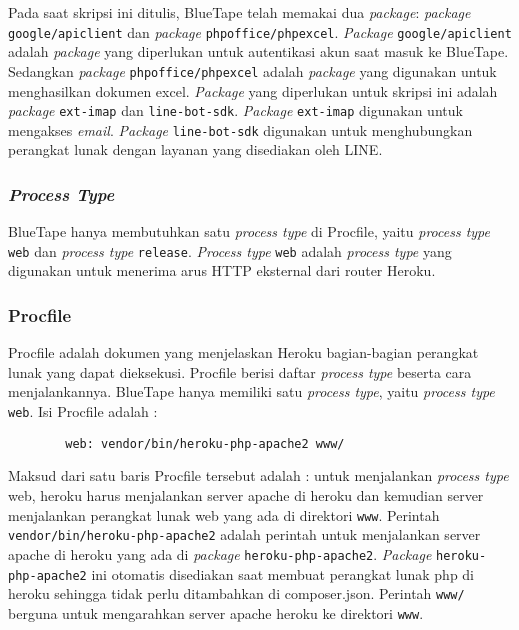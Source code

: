 		Pada saat skripsi ini ditulis, BlueTape telah memakai dua \textit{package}: \textit{package} \texttt{google/apiclient} dan \textit{package} \texttt{phpoffice/phpexcel}. \textit{Package} \texttt{google/apiclient} adalah \textit{package} yang diperlukan untuk autentikasi akun saat masuk ke BlueTape. Sedangkan \textit{package} \texttt{phpoffice/phpexcel} adalah \textit{package} yang digunakan untuk menghasilkan dokumen excel. \textit{Package} yang diperlukan untuk skripsi ini adalah \textit{package} \texttt{ext-imap} dan \texttt{line-bot-sdk}. \textit{Package} \texttt{ext-imap} digunakan untuk mengakses \textit{email}. \textit{Package} \texttt{line-bot-sdk} digunakan untuk menghubungkan perangkat lunak dengan layanan yang disediakan oleh LINE.
		
	\subsubsection{\textit{Process Type}}
		BlueTape hanya membutuhkan satu \textit{process type} di Procfile, yaitu \textit{process type} \texttt{web} dan \textit{process type} \texttt{release}. \textit{Process type} \texttt{web} adalah \textit{process type} yang digunakan untuk menerima arus HTTP eksternal dari router Heroku.
		
	\subsubsection{Procfile}
		Procfile adalah dokumen yang menjelaskan Heroku bagian-bagian perangkat lunak yang dapat dieksekusi. Procfile berisi daftar \textit{process type} beserta cara menjalankannya. BlueTape hanya memiliki satu \textit{process type}, yaitu \textit{process type} \texttt{web}. Isi Procfile adalah :
		\begin{lstlisting}
		web: vendor/bin/heroku-php-apache2 www/
		\end{lstlisting}
		
		Maksud dari satu baris Procfile tersebut adalah : untuk menjalankan \textit{process type} web, heroku harus menjalankan server apache di heroku dan kemudian server menjalankan perangkat lunak web yang ada di direktori \texttt{www}. Perintah \texttt{vendor/bin/heroku-php-apache2} adalah perintah untuk menjalankan server apache di heroku yang ada di \textit{package} \texttt{heroku-php-apache2}. \textit{Package} \texttt{heroku-php-apache2} ini otomatis disediakan saat membuat perangkat lunak php di heroku sehingga tidak perlu ditambahkan di composer.json. Perintah \texttt{www/} berguna untuk mengarahkan server apache heroku ke direktori \texttt{www}.
		
